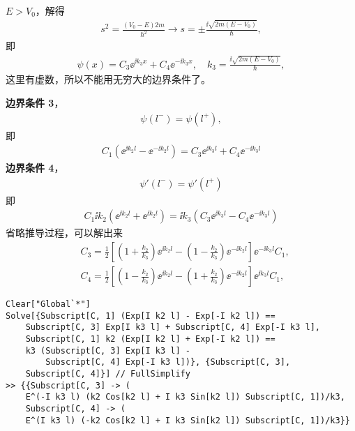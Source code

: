   $E > V_0$，解得
\begin{eqnarray}
    s^2 = \frac{(V_0 - E) 2 m}{\hbar ^2} \rightarrow s = \pm \frac{\ii \sqrt{2m(E- V_0)}}{\hbar},
\end{eqnarray}
即
\begin{eqnarray}
    \psi(x) = C_3 \ee^{\ii k_3 x} + C_4 \ee ^{-\ii k_3 x}, \quad k_3 = \frac{\ii\sqrt{2m(E-V_0)}}{\hbar},
\end{eqnarray}
这里有虚数，所以不能用无穷大的边界条件了。

\textbf{边界条件 3}，
\begin{eqnarray}
    \psi(l^-) = \psi(l^+),
\end{eqnarray}
即
\begin{eqnarray}
    C_1 (\ee^{\ii k_2 l} - \ee^{-\ii k_2 l}) = 
    C_3 \ee^{\ii k_3 l} + C_4 \ee^{-\ii k_3 l}
\end{eqnarray}
\textbf{边界条件 4}，
\begin{eqnarray}
    \psi'(l^-) = \psi'(l^+)
\end{eqnarray}
即
\begin{eqnarray}
    C_1 \ii k_2 (\ee^{\ii k_2 l} + \ee^{\ii k_2 l}) = \ii k_3 (C_3 \ee^{\ii k_3 l} - C_4 \ee^{-\ii k_3 l} )
\end{eqnarray}
省略推导过程，可以解出来
\begin{align}
    &C_3 = \frac12 \left[
        \left(1 + \frac{k_2}{k_3}\right) \ee^{\ii k_2 l} - 
        \left(1 - \frac{k_2}{k_3}\right) \ee^{-\ii k _2 l}
    \right] \ee^{-\ii k_3 l }C_1, \label{eq:half_inf_scat_c3}\\
    &C_4 = \frac12 \left[
        \left(1 - \frac{k_2}{k_3}\right) \ee^{\ii k_2 l} - 
        \left(1 + \frac{k_2}{k_3}\right) \ee^{-\ii k_2 l}
    \right] \ee^{\ii k_3 l} C_1, \label{eq:half_inf_scat_c4}
\end{align}
\begin{lstlisting}
Clear["Global`*"]
Solve[{Subscript[C, 1] (Exp[I k2 l] - Exp[-I k2 l]) == 
    Subscript[C, 3] Exp[I k3 l] + Subscript[C, 4] Exp[-I k3 l], 
    Subscript[C, 1] k2 (Exp[I k2 l] + Exp[-I k2 l]) == 
    k3 (Subscript[C, 3] Exp[I k3 l] - 
        Subscript[C, 4] Exp[-I k3 l])}, {Subscript[C, 3], 
    Subscript[C, 4]}] // FullSimplify
>> {{Subscript[C, 3] -> (
    E^(-I k3 l) (k2 Cos[k2 l] + I k3 Sin[k2 l]) Subscript[C, 1])/k3, 
    Subscript[C, 4] -> (
    E^(I k3 l) (-k2 Cos[k2 l] + I k3 Sin[k2 l]) Subscript[C, 1])/k3}}
\end{lstlisting}

